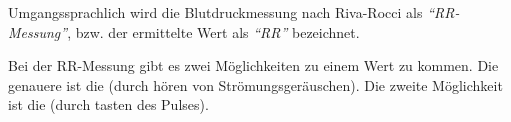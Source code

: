 
Umgangssprachlich wird die Blutdruckmessung nach Riva-Rocci als
\emph{"`RR-Messung"'}, bzw. der ermittelte Wert als \emph{"`RR"'} bezeichnet.

Bei der RR-Messung gibt es zwei Möglichkeiten zu
einem Wert zu kommen. Die genauere ist die
 (durch hören von
Strömungsgeräuschen). Die zweite Möglichkeit ist die
 (durch tasten des Pulses). 




